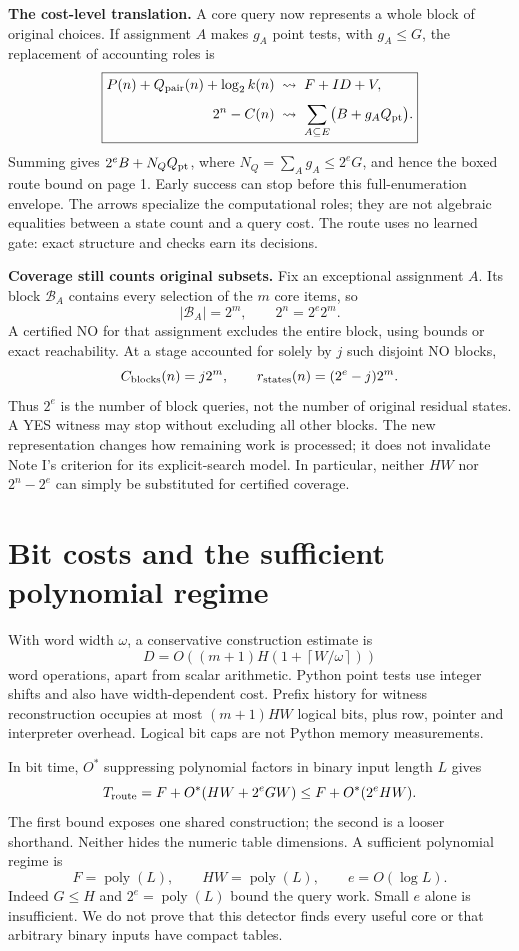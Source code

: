 \documentclass[10pt,english]{article}
\newcommand{\poly}{\operatorname{poly}}
\begin{document}
\textbf{The cost-level translation.} A core query now represents a whole block of original choices. If assignment $A$ makes $g_A$ point tests, with $g_A\le G$, the replacement of accounting roles is
$$
\boxed{\begin{aligned}
P(n)+Q_{\rm pair}(n)+\log_2 k(n)&\;\rightsquigarrow\;F+ID+V,\\[3pt]
2^n-C(n)&\;\rightsquigarrow\;\sum_{A\subseteq E}\bigl(B+g_AQ_{\rm pt}\bigr).
\end{aligned}}
$$
Summing gives $2^eB+N_QQ_{\rm pt}$, where $N_Q=\sum_Ag_A\le2^eG$, and hence the boxed route bound on page 1. Early success can stop before this full-enumeration envelope. The arrows specialize the computational roles; they are not algebraic equalities between a state count and a query cost. The route uses no learned gate: exact structure and checks earn its decisions.

\textbf{Coverage still counts original subsets.} Fix an exceptional assignment $A$. Its block $\mathcal B_A$ contains every selection of the $m$ core items, so
$$
|\mathcal B_A|=2^m,\qquad 2^n=2^e2^m.
$$
A certified NO for that assignment excludes the entire block, using bounds or exact reachability. At a stage accounted for solely by $j$ such disjoint NO blocks,
$$
C_{\rm blocks}(n)=j2^m,\qquad r_{\rm states}(n)=(2^e-j)2^m.
$$
Thus $2^e$ is the number of block queries, not the number of original residual states. A YES witness may stop without excluding all other blocks. The new representation changes how remaining work is processed; it does not invalidate Note I's criterion for its explicit-search model. In particular, neither $HW$ nor $2^n-2^e$ can simply be substituted for certified coverage.

\section{Bit costs and the sufficient polynomial regime}
With word width $\omega$, a conservative construction estimate is
$$
D=O\!\left((m+1)H\left(1+\left\lceil W/\omega\right\rceil\right)\right)
$$
word operations, apart from scalar arithmetic. Python point tests use integer shifts and also have width-dependent cost. Prefix history for witness reconstruction occupies at most $(m+1)HW$ logical bits, plus row, pointer and interpreter overhead. Logical bit caps are not Python memory measurements.

In bit time, $O^*$ suppressing polynomial factors in binary input length $L$ gives
$$
T_{\rm route}=F+O^*(HW+2^eGW)\le F+O^*(2^eHW).
$$
The first bound exposes one shared construction; the second is a looser shorthand. Neither hides the numeric table dimensions. A sufficient polynomial regime is
$$
F=\poly(L),\qquad HW=\poly(L),\qquad e=O(\log L).
$$
Indeed $G\le H$ and $2^e=\poly(L)$ bound the query work. Small $e$ alone is insufficient. We do not prove that this detector finds every useful core or that arbitrary binary inputs have compact tables.
\end{document}
